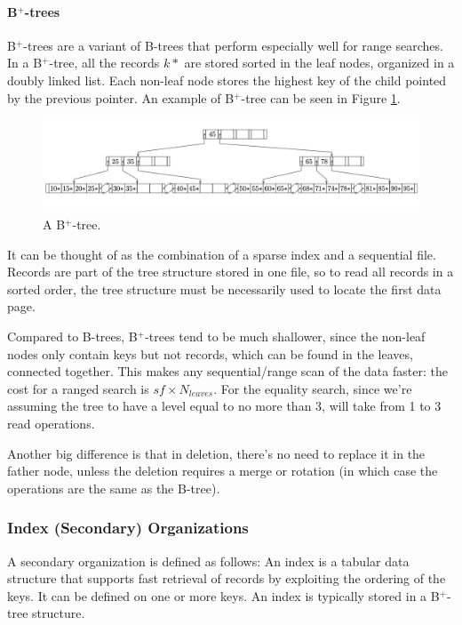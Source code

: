 \paragraph{B$^+$-trees}

B$^+$-trees are a variant of B-trees that perform especially well for range searches. In a B$^+$-tree, all the records $k*$ are stored sorted in the leaf nodes, organized in a doubly linked list. Each non-leaf node stores the highest key of the child pointed by the previous pointer. An example of B$^+$-tree can be seen in Figure \ref{fig:B+-tree}.

\begin{figure}[ht]
    \centering
    \includegraphics[width=1\linewidth]{img/B+-tree.png}
    \caption{A B$^+$-tree.}
    \label{fig:B+-tree}
\end{figure}
It can be thought of as the combination of a sparse index and a sequential file. Records are part of the tree structure stored in one file, so to read all records in a sorted order, the tree structure must be necessarily used to locate the first data page.

Compared to B-trees, B$^+$-trees tend to be much shallower, since the non-leaf nodes only contain keys but not records, which can be found in the leaves, connected together. This makes any sequential/range scan of the data faster: the cost for a ranged search is $sf \times N_{leaves}$. For the equality search, since we're assuming the tree to have a level equal to no more than 3, will take from 1 to 3 read operations.

Another big difference is that in deletion, there's no need to replace it in the father node, unless the deletion requires a merge or rotation (in which case the operations are the same as the B-tree).

\subsubsection{Index (Secondary) Organizations}

A secondary organization is defined as follows:
An index is a tabular data structure that supports fast retrieval of records by exploiting the ordering of the keys. It can be defined on one or more keys. An index is typically stored in a B$^+$-tree structure.

